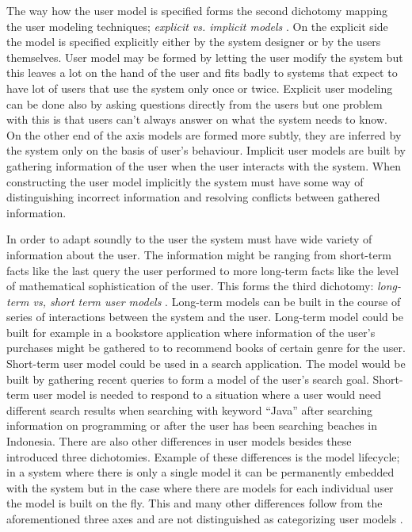 \documentclass{sigchi}
\begin{document}
The way how the user model is specified forms the second dichotomy mapping the user modeling techniques; \textit{explicit vs. implicit models} \cite{rich99}. On the explicit side the model is specified explicitly either by the system designer or by the users themselves. User model may be formed by letting the user modify the system but this leaves a lot on the hand of the user and fits badly to systems that expect to have lot of users that use the system only once or twice. Explicit user modeling can be done also by asking questions directly from the users but one problem with this is that users can't always answer on what the system needs to know. On the other end of the axis models are formed more subtly, they are inferred by the system only on the basis of user's behaviour. Implicit user models are built by gathering information of the user when the user interacts with the system. When constructing the user model implicitly the system must have some way of distinguishing incorrect information and resolving conflicts between gathered information.

In order to adapt soundly to the user the system must have wide variety of information about the user. The information might be ranging from short-term facts like the last query the user performed to more long-term facts like the level of mathematical sophistication of the user. This forms the third dichotomy: \textit{long-term vs, short term user models} \cite{rich99}. Long-term models can be built in the course of series of interactions between the system and the user. Long-term model could be built for example in a bookstore application where information of the user's purchases might be gathered to to recommend books of certain genre for the user. Short-term user model could be used in a search application. The model would be built by gathering recent queries to form a model of the user's search goal. Short-term user model is needed to respond to a situation where a user would need different search results when searching with keyword “Java” after searching information on programming or after the user has been searching beaches in Indonesia. There are also other differences in user models besides these introduced three dichotomies. Example of these differences is the model lifecycle; in a system where there is only a single model it can be permanently embedded with the system but in the case where there are models for each individual user the model is built on the fly. This and many other differences follow from the aforementioned three axes and are not distinguished as categorizing user models \cite{rich99}. 
\end{document}
